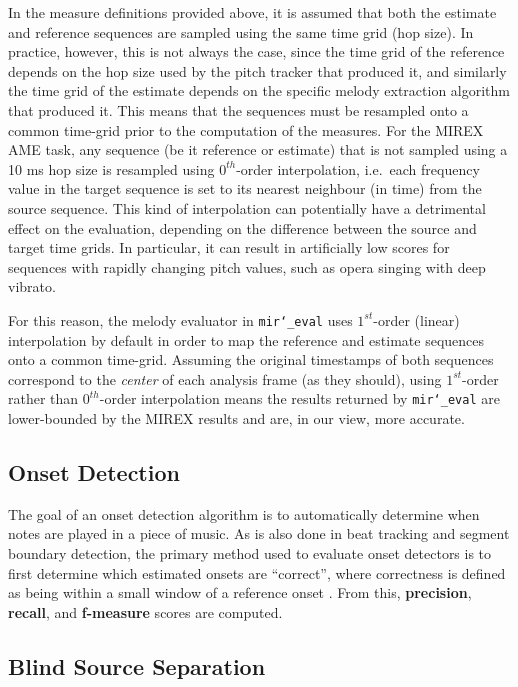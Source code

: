 \documentclass{article}
\def\mireval{\texttt{mir\char`_eval}}
\begin{document}
In the measure definitions provided above, it is assumed that both the estimate
and reference sequences are sampled using the same time grid (hop size). In
practice, however, this is not always the case, since the time grid of the
reference depends on the hop size used by the pitch tracker that produced
it, and similarly the time grid of the estimate depends on the specific melody
extraction algorithm that produced it. This means that the sequences must be
resampled onto a common time-grid prior to the computation of the measures. For
the MIREX AME task, any sequence (be it reference or estimate) that is not
sampled using a 10 ms hop size is resampled using $0^{th}$-order interpolation,
i.e.~each frequency value in the target sequence is set to its nearest
neighbour (in time) from the source sequence. This kind of interpolation can
potentially have a detrimental effect on the evaluation, depending on the
difference between the source and target time grids. In particular, it can
result in artificially low scores for sequences with rapidly changing pitch
values, such as opera singing with deep vibrato. 

For this reason, the melody evaluator in \mireval{} uses $1^{st}$-order (linear)
interpolation by default in order to map the reference and estimate sequences
onto a common time-grid. Assuming the original timestamps of both sequences
correspond to the \textit{center} of each analysis frame (as they should),
using $1^{st}$-order rather than $0^{th}$-order interpolation means the results
returned by \mireval{} are lower-bounded by the MIREX results and are, in our
view, more accurate.

\subsection{Onset Detection}

The goal of an onset detection algorithm is to automatically determine when notes are played in a piece of music.  As is also done in beat tracking and segment boundary detection, the primary method used to evaluate onset detectors is to first determine which estimated onsets are ``correct'', where correctness is defined as being within a small window of a reference onset \cite{bock2012evaluating}.  From this, \textbf{precision}, \textbf{recall}, and \textbf{f-measure} scores are computed.  

\subsection{Blind Source Separation}
\end{document}
